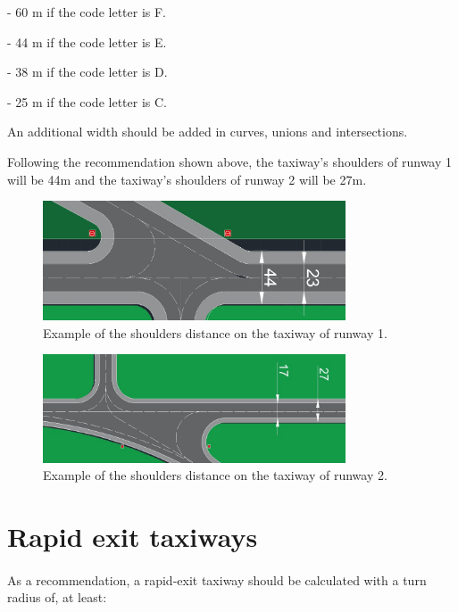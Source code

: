 	-	60 m if the code letter is F.
	
	-	44 m if the code letter is E.
	
	-	38 m if the code letter is D.
	
	-	25 m if the code letter is C.
	
	An additional width should be added in curves, unions and intersections.
	
	Following the recommendation shown above, the taxiway's shoulders of runway 1 will be 44m and the taxiway's shoulders of runway 2 will be 27m.
	
	\begin{figure}[H]
		\centering
		\includegraphics[clip, trim=0.03cm 0cm 0cm 0.03cm, width=0.8\textwidth]{./images/taxiway/shoulders1}
		\caption{Example of the shoulders distance on the taxiway of runway 1.} %
		\label{} %
	\end{figure}

	\begin{figure}[H]
		\centering
		\includegraphics[clip, trim=0.03cm 0cm 0cm 0.03cm, width=0.8\textwidth]{./images/taxiway/shoulders2}
		\caption{Example of the shoulders distance on the taxiway of runway 2.} %
		\label{} %
	\end{figure}
	
	\section{Rapid exit taxiways}
		\paragraph{}As a recommendation, a rapid-exit taxiway should be calculated with a turn radius of, at least:
		
